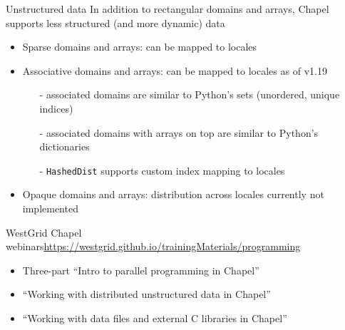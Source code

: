 \documentclass[10pt,xcolor=pdftex,dvipsnames,table]{beamer}
\begin{document}
\begin{frame}{Unstructured data}
  In addition to rectangular domains and arrays, Chapel supports less structured (and more dynamic) data
  \bigskip
  \begin{itemize}[]\setlength{\itemsep}{3mm}
  \item Sparse domains and arrays: can be mapped to locales
  \item Associative domains and arrays: can be mapped to locales as of v1.19
    \begin{itemize}[]\setlength{\itemsep}{1mm}
    \item[-] associated domains are similar to Python's sets (unordered, unique indices)
    \item[-] associated domains with arrays on top are similar to Python's dictionaries
    \item[-] \texttt{HashedDist} supports custom index mapping to locales
    \end{itemize}
  \item Opaque domains and arrays: distribution across locales currently not implemented
  \end{itemize}
\end{frame}

\begin{frame}{WestGrid Chapel webinars}{\small\url{https://westgrid.github.io/trainingMaterials/programming}}
  \begin{itemize}[]\setlength{\itemsep}{5mm}
  \item Three-part {\sc ``Intro to parallel programming in Chapel''}
  \item {\sc ``Working with distributed unstructured data in Chapel''}
  \item {\sc ``Working with data files and external C libraries in Chapel''}
  \end{itemize}
\end{frame}



\end{document}
